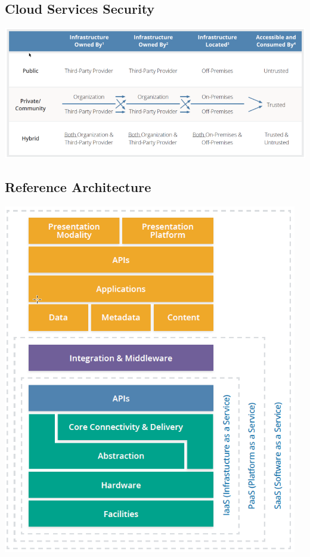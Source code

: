 \documentclass[a4]{article}
\begin{document}
\begin{multicols}{3}
\subsection{Cloud Services Security}
\includegraphics[width=\columnwidth]{cloud-service-security.png}

\subsection{Reference Architecture}
\begin{center}
    \includegraphics[width=0.6\columnwidth]{cloud-services-reference-arch.png}
\end{center}


\end{multicols}
\end{document}
